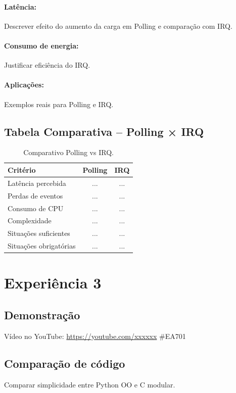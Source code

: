 \documentclass{article}
\begin{document}
\paragraph{Latência:} Descrever efeito do aumento da carga em Polling e comparação com IRQ.  
\paragraph{Consumo de energia:} Justificar eficiência do IRQ.  
\paragraph{Aplicações:} Exemplos reais para Polling e IRQ.  

\subsection{Tabela Comparativa -- Polling × IRQ}
\begin{table}[H]
    \centering
    \begin{tabular}{lcc}
        \toprule
        Critério & Polling & IRQ \\
        \midrule
        Latência percebida & ... & ... \\
        Perdas de eventos & ... & ... \\
        Consumo de CPU & ... & ... \\
        Complexidade & ... & ... \\
        Situações suficientes & ... & ... \\
        Situações obrigatórias & ... & ... \\
        \bottomrule
    \end{tabular}
    \caption{Comparativo Polling vs IRQ.}
\end{table}

\section{Experiência 3}

\subsection{Demonstração}
Vídeo no YouTube: \url{https://youtube.com/xxxxxx} \#EA701  

\subsection{Comparação de código}
Comparar simplicidade entre Python OO e C modular.  
\end{document}
